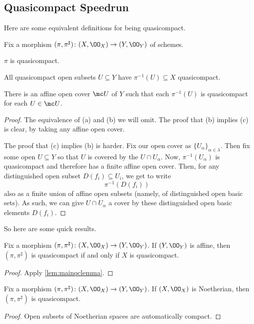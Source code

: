 \documentclass[../notes.tex]{subfiles}
\begin{document}
\subsection{Quasicompact Speedrun}
Here are some equivalent definitions for being quasicompact.
\begin{lemma} \label{lem:mainqclemma}
	Fix a morphism $(\pi,\pi^\sharp)\colon(X,\OO_X)\to(Y,\OO_Y)$ of schemes.
	\begin{listalph}
		\item $\pi$ is quasicompact.
		\item All quasicompact open subsets $U\subseteq Y$ have $\pi^{-1}(U)\subseteq X$ quasicompact.
		\item There is an affine open cover $\mc U$ of $Y$ such that each $\pi^{-1}(U)$ is quasicompact for each $U\in\mc U$.
	\end{listalph}
\end{lemma}
\begin{proof}
	The equivalence of (a) and (b) we will omit. The proof that (b) implies (c) is clear, by taking any affine open cover.

	The proof that (c) implies (b) is harder. Fix our open cover as $\{U_\alpha\}_{\alpha\in\lambda}$. Then fix some open $U\subseteq Y$ so that $U$ is covered by the $U\cap U_\alpha$. Now, $\pi^{-1}(U_\alpha)$ is quasicompact and therefore has a finite affine open cover. Then, for any distinguished open subset $D(f_i)\subseteq U_i$, we get to write
	\[\pi^{-1}(D(f_i))\]
	also as a finite union of affine open subsets (namely, of distinguished open basic sets). As such, we can give $U\cap U_\alpha$ a cover by these distinguished open basic elements $D(f_i)$.
\end{proof}
So here are some quick results.
\begin{cor}
	Fix a morphism $(\pi,\pi^\sharp)\colon(X,\OO_X)\to(Y,\OO_Y)$. If $(Y,\OO_Y)$ is affine, then $(\pi,\pi^\sharp)$ is quasicompact if and only if $X$ is quasicompact.
\end{cor}
\begin{proof}
	Apply \autoref{lem:mainqclemma}.
\end{proof}
\begin{corollary}
	Fix a morphism $(\pi,\pi^\sharp)\colon(X,\OO_X)\to(Y,\OO_Y)$. If $(X,\OO_X)$ is Noetherian, then $(\pi,\pi^\sharp)$ is quasicompact.
\end{corollary}
\begin{proof}
	Open subsets of Noetherian spaces are automatically compact.
\end{proof}
\end{document}
